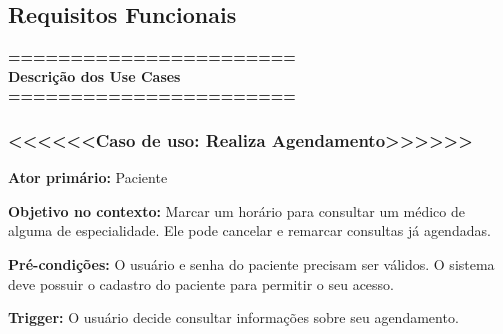 \documentclass[12pt,a4paper]{report}
\begin{document}
\subsection{Requisitos Funcionais}

\begin{center}
\textbf{=======================\\
Descrição dos Use Cases\\
=======================\\}
\end{center}

\subsubsection{<<<<<<Caso de uso: Realiza Agendamento>>>>>>} 

\textbf{Ator primário:} Paciente \newline

\textbf{Objetivo no contexto:} Marcar um horário para consultar um médico de alguma de especialidade. Ele pode cancelar e remarcar consultas já agendadas.\newline

\textbf{Pré-condições:}  O usuário e senha do paciente precisam ser válidos. O sistema deve possuir o cadastro do paciente para permitir o seu acesso.\newline

\textbf{Trigger:} O usuário decide consultar informações sobre seu agendamento.\newline
\end{document}
